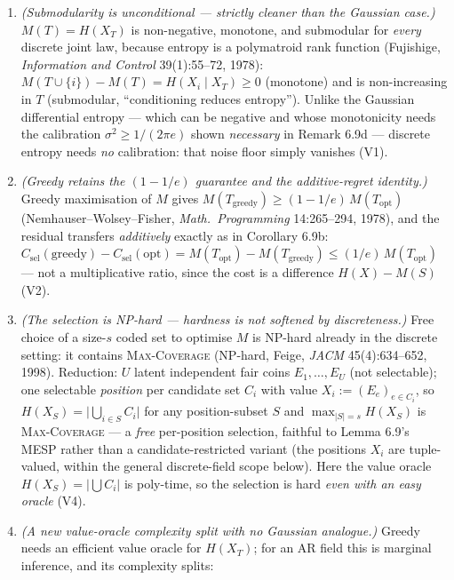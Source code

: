 \documentclass[
]{article}
\begin{document}
\begin{enumerate}
\item \emph{(Submodularity is unconditional --- strictly cleaner than the
Gaussian case.)} $M(T)=H(X_T)$ is non-negative, monotone, and submodular
for \emph{every} discrete joint law, because entropy is a polymatroid rank
function (Fujishige, \emph{Information and Control} 39(1):55--72, 1978):
$M(T\cup\{i\})-M(T)=H(X_i\mid X_T)\ge 0$ (monotone) and is non-increasing in
$T$ (submodular, ``conditioning reduces entropy''). Unlike the Gaussian
differential entropy --- which can be negative and whose monotonicity needs
the calibration $\sigma^2\ge 1/(2\pi e)$ shown \emph{necessary} in Remark
6.9d --- discrete entropy needs \emph{no} calibration: that noise floor
simply vanishes (V1).
\item \emph{(Greedy retains the $(1-1/e)$ guarantee and the additive-regret
identity.)} Greedy maximisation of $M$ gives $M(T_{\mathrm{greedy}})\ge
(1-1/e)\,M(T_{\mathrm{opt}})$ (Nemhauser--Wolsey--Fisher, \emph{Math.\
Programming} 14:265--294, 1978), and the residual transfers \emph{additively}
exactly as in Corollary 6.9b: $C_{\mathrm{sel}}(\text{greedy}) -
C_{\mathrm{sel}}(\text{opt}) = M(T_{\mathrm{opt}}) - M(T_{\mathrm{greedy}})
\le (1/e)\,M(T_{\mathrm{opt}})$ --- not a multiplicative ratio, since the cost
is a difference $H(X)-M(S)$ (V2).
\item \emph{(The selection is NP-hard --- hardness is \emph{not} softened by
discreteness.)} Free choice of a size-$s$ coded set to optimise $M$ is
NP-hard already in the discrete setting: it contains \textsc{Max-Coverage}
(NP-hard, Feige, \emph{JACM} 45(4):634--652, 1998). Reduction: $U$ latent
independent fair coins $E_1,\dots,E_U$ (not selectable); one selectable
\emph{position} per candidate set $C_i$ with value $X_i:=(E_e)_{e\in C_i}$,
so $H(X_S)=\bigl|\bigcup_{i\in S} C_i\bigr|$ for any position-subset $S$ and
$\max_{|S|=s}H(X_S)$ is \textsc{Max-Coverage} --- a \emph{free} per-position
selection, faithful to Lemma 6.9's MESP rather than a candidate-restricted
variant (the positions $X_i$ are tuple-valued, within the general
discrete-field scope below). Here the value oracle $H(X_S)=|\bigcup C_i|$ is
poly-time, so the selection is hard \emph{even with an easy oracle} (V4).
\item \emph{(A new value-oracle complexity split with no Gaussian analogue.)}
Greedy needs an efficient value oracle for $H(X_T)$; for an AR field this is
marginal inference, and its complexity splits:
\begin{itemize}

\end{itemize}
\end{enumerate}
\end{document}
